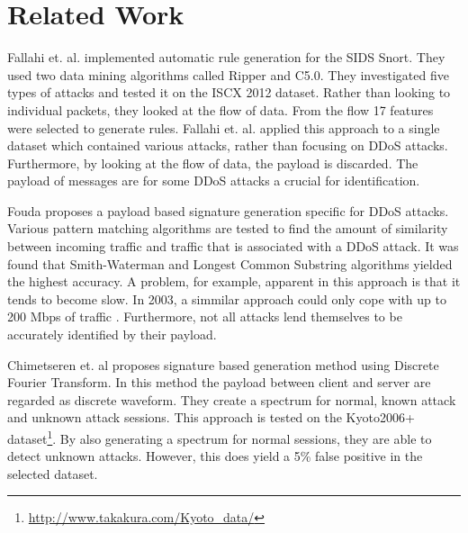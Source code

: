 \section{Related Work}
Fallahi et. al. \cite{Fallahi2016} implemented automatic rule generation for the SIDS Snort. They used two data mining algorithms called Ripper and C5.0. They investigated five types of attacks and tested it on the ISCX 2012 dataset. Rather than looking to individual packets, they looked at the flow of data. From the flow 17 features were selected to generate rules. Fallahi et. al. applied this approach to a single dataset which contained various attacks, rather than focusing on DDoS attacks. Furthermore, by looking at the flow of data, the payload is discarded. The payload of messages are for some DDoS attacks a crucial for identification.  

Fouda \cite{Fouda2017} proposes a payload based signature generation specific for DDoS attacks. Various pattern matching algorithms are tested to find the amount of similarity between incoming traffic and traffic that is associated with a DDoS attack. It was found that Smith-Waterman and Longest Common Substring algorithms yielded the highest accuracy. A problem, for example, apparent in this approach is that it tends to become slow. In 2003, a simmilar approach could only cope with up to 200 Mbps of traffic \cite{Lai2004}. Furthermore, not all attacks lend themselves to be accurately identified by their payload. 

Chimetseren et. al \cite{Chimetseren2014} proposes signature based generation method using Discrete Fourier Transform. In this method the payload between client and server are regarded as discrete waveform. They create a spectrum for normal, known attack and unknown attack sessions.  This approach is tested on the Kyoto2006+ dataset\footnote{\url{http://www.takakura.com/Kyoto_data/}}. By also generating a spectrum for normal sessions, they are able to detect unknown attacks. However, this does yield a 5\% false positive in the selected dataset.  

